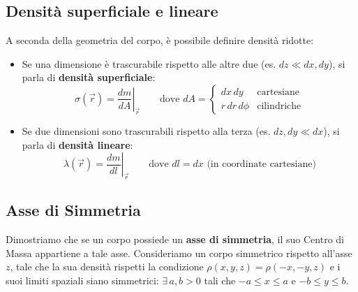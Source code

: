 \subsection{Densità superficiale e lineare}
A seconda della geometria del corpo, è possibile definire densità ridotte:
\begin{itemize}
    \item Se una dimensione è trascurabile rispetto alle altre due (es. $dz \ll dx, dy$), si parla di \textbf{densità superficiale}:
    \begin{equation}
        \sigma(\vec{r}) = \left. \frac{dm}{dA} \right|_{\vec{r}} \qquad \text{dove } dA = 
        \begin{cases} 
        dx \, dy & \text{cartesiane} \\ 
        r \, dr \, d\phi & \text{cilindriche} 
        \end{cases}
    \end{equation}
    \item Se due dimensioni sono trascurabili rispetto alla terza (es. $dz, dy \ll dx$), si parla di \textbf{densità lineare}:
    \begin{equation}
        \lambda(\vec{r}) = \left. \frac{dm}{dl} \right|_{\vec{r}} \qquad \text{dove } dl = dx \text{ (in coordinate cartesiane)}
    \end{equation}
\end{itemize}

\subsection{Asse di Simmetria}
Dimostriamo che se un corpo possiede un \textbf{asse di simmetria}, il suo Centro di Massa appartiene a tale asse.
Consideriamo un corpo simmetrico rispetto all'asse $z$, tale che la sua densità rispetti la condizione $\rho(x,y,z) = \rho(-x,-y,z)$ e i suoi limiti spaziali siano simmetrici: $\exists \, a, b > 0$ tali che $-a \le x \le a$ e $-b \le y \le b$.

